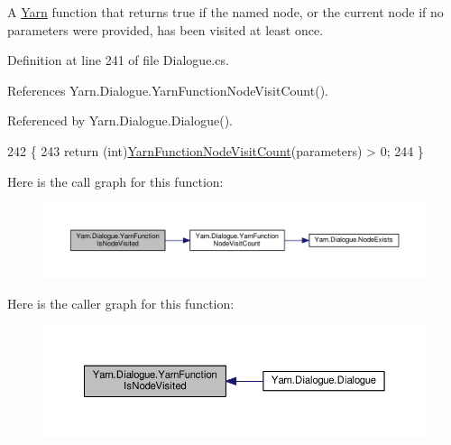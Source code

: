 A \hyperlink{a00041}{Yarn} function that returns true if the named node, or the current node if no parameters were provided, has been visited at least once. 



Definition at line 241 of file Dialogue.\-cs.



References Yarn.\-Dialogue.\-Yarn\-Function\-Node\-Visit\-Count().



Referenced by Yarn.\-Dialogue.\-Dialogue().


\begin{DoxyCode}
242         \{
243             \textcolor{keywordflow}{return} (\textcolor{keywordtype}{int})\hyperlink{a00082_a10c9f22d3f55e74f091cd6069c431094}{YarnFunctionNodeVisitCount}(parameters) > 0;
244         \}
\end{DoxyCode}


Here is the call graph for this function\-:
\nopagebreak
\begin{figure}[H]
\begin{center}
\leavevmode
\includegraphics[width=350pt]{a00082_a1ab129bd84381928531d503304ca08d6_cgraph}
\end{center}
\end{figure}




Here is the caller graph for this function\-:
\nopagebreak
\begin{figure}[H]
\begin{center}
\leavevmode
\includegraphics[width=350pt]{a00082_a1ab129bd84381928531d503304ca08d6_icgraph}
\end{center}
\end{figure}


